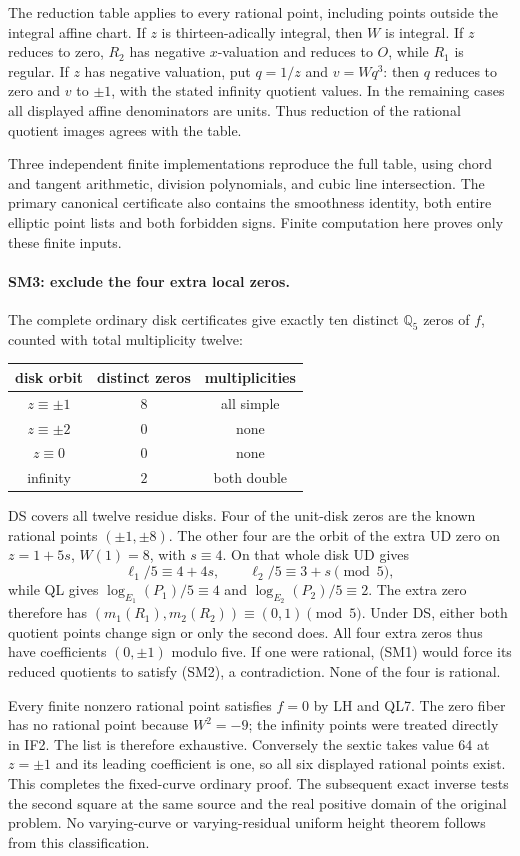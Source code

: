 The reduction table applies to every rational point, including points
outside the integral affine chart. If $z$ is thirteen-adically integral,
then $W$ is integral. If $z$ reduces to zero, $R_2$ has negative
$x$-valuation and reduces to $O$, while $R_1$ is regular. If $z$ has
negative valuation, put $q=1/z$ and $v=Wq^3$: then $q$ reduces to zero
and $v$ to $\pm1$, with the stated infinity quotient values. In the
remaining cases all displayed affine denominators are units. Thus
reduction of the rational quotient images agrees with the table.

Three independent finite implementations reproduce the full table,
using chord and tangent arithmetic, division polynomials, and cubic
line intersection. The primary canonical certificate also contains
the smoothness identity, both entire elliptic point lists and both
forbidden signs. Finite computation here proves only these finite inputs.

\paragraph{SM3: exclude the four extra local zeros.}
The complete ordinary disk certificates give exactly ten distinct
$\mathbb Q_5$ zeros of $f$, counted with total multiplicity twelve:
\begin{center}
\begin{tabular}{c|c|c}
 disk orbit & distinct zeros & multiplicities\\\hline
 $z\equiv\pm1$ & $8$ & all simple\\
 $z\equiv\pm2$ & $0$ & none\\
 $z\equiv0$ & $0$ & none\\
 infinity & $2$ & both double
\end{tabular}
\end{center}
DS covers all twelve residue disks. Four of the unit-disk zeros are
the known rational points $(\pm1,\pm8)$. The other four are the
orbit of the extra UD zero on $z=1+5s$, $W(1)=8$, with $s\equiv4$.
On that whole disk UD gives
\[
 \ell_1/5\equiv4+4s,\qquad \ell_2/5\equiv3+s\pmod5,
\]
while QL gives $\log_{E_1}(P_1)/5\equiv4$ and
$\log_{E_2}(P_2)/5\equiv2$. The extra zero therefore has
$(m_1(R_1),m_2(R_2))\equiv(0,1)\pmod5$. Under DS, either both
quotient points change sign or only the second does. All four extra
zeros thus have coefficients $(0,\pm1)$ modulo five.
If one were rational, (SM1) would force its reduced quotients to
satisfy (SM2), a contradiction. None of the four is rational.

Every finite nonzero rational point satisfies $f=0$ by LH and QL7.
The zero fiber has no rational point because $W^2=-9$; the infinity
points were treated directly in IF2. The list is therefore exhaustive.
Conversely the sextic takes value $64$ at $z=\pm1$ and its leading
coefficient is one, so all six displayed rational points exist.
This completes the fixed-curve ordinary proof. The subsequent exact
inverse tests the second square at the same source and the real
positive domain of the original problem. No varying-curve or
varying-residual uniform height theorem follows from this classification.
